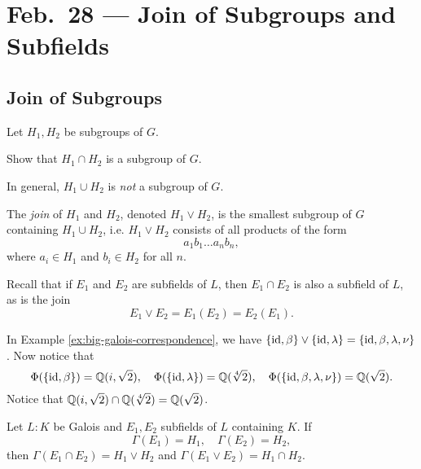 \chapter{Feb.~28 --- Join of Subgroups and Subfields}

\section{Join of Subgroups}

Let $H_1, H_2$ be subgroups of $G$.

\begin{exercise}
  Show that $H_1 \cap H_2$ is a subgroup of $G$.
\end{exercise}

\begin{remark}
  In general, $H_1 \cup H_2$ is \emph{not} a subgroup
  of $G$.
\end{remark}

\begin{definition}
  The \emph{join} of $H_1$ and $H_2$, denoted
  $H_1 \lor H_2$,
  is the smallest subgroup of $G$ containing
  $H_1 \cup H_2$, i.e. $H_1 \lor H_2$ consists
  of all products of the form
  \[
    a_1 b_1 \dots a_n b_n,
  \]
  where $a_i \in H_1$ and $b_i \in H_2$ for all $n$.
\end{definition}

\begin{remark}
  Recall that if $E_1$ and $E_2$ are subfields of
  $L$, then $E_1 \cap E_2$ is also a subfield of $L$,
  as is the join
  \[E_1 \lor E_2 = E_1(E_2) = E_2(E_1).\]
\end{remark}

\begin{example}
  In Example \ref{ex:big-galois-correspondence},
  we have $\{\mathrm{id}, \beta\} \lor \{\mathrm{id}, \lambda\} = \{\mathrm{id}, \beta, \lambda, \nu\}$.
  Now notice that
  \[
    \Phi(\{\mathrm{id}, \beta\}) = \mathbb{Q}(i, \sqrt{2}), \quad
    \Phi(\{\mathrm{id}, \lambda\}) = \mathbb{Q}(\sqrt[4]{2}), \quad
    \Phi(\{\mathrm{id}, \beta, \lambda, \nu\}) = \mathbb{Q}(\sqrt{2}).
  \]
  Notice that
  $\mathbb{Q}(i, \sqrt{2}) \cap \mathbb{Q}(\sqrt[4]{2}) = \mathbb{Q}(\sqrt{2})$.
\end{example}

\begin{theorem}
  Let $L : K$ be Galois and $E_1, E_2$ subfields
  of $L$ containing $K$. If
  \[
    \Gamma(E_1) = H_1, \quad \Gamma(E_2) = H_2,
  \]
  then $\Gamma(E_1 \cap E_2) = H_1 \lor H_2$ and
  $\Gamma(E_1 \lor E_2) = H_1 \cap H_2$.
\end{theorem}

